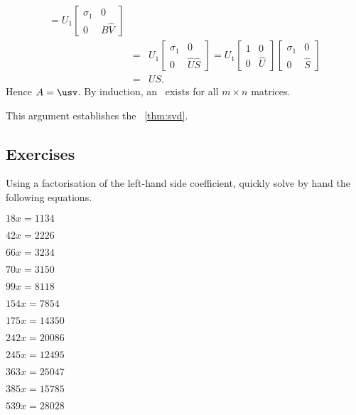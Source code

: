 \begin{enumerate}
\begin{eqnarray*}
=U_1\begin{bmatrix} \sigma_1&0 \\0&B\hat V \end{bmatrix}
\\&=&U_1\begin{bmatrix} \sigma_1&0 \\0&\hat U\hat S \end{bmatrix}
=U_1\begin{bmatrix} 1&0 \\0&\hat U \end{bmatrix}
\begin{bmatrix} \sigma_1&0 \\0&\hat S \end{bmatrix}
\\&=&US.
\end{eqnarray*}
Hence \(A=\usv\). 
By induction, an \svd\ exists for all \(m\times n\) matrices.
\end{enumerate}
This argument establishes the \svd\ \autoref{thm:svd}.







\subsection{Exercises}



\begin{exercise} \label{ex:} 
Using a factorisation of the left-hand side coefficient, quickly solve by hand the following equations.
\begin{parts}
\item \(18 x=1134\)
\item \(42 x=2226\)
\item \(66 x=3234\)
\item \(70 x=3150\)
\item \(99 x=8118\)
\item \(154 x=7854\)
\item \(175 x=14350\)
\item \(242 x=20086\)
\item \(245 x=12495\)
\item \(363 x=25047\)
\item \(385 x=15785\)
\item \(539 x=28028\)
\end{parts}
\end{exercise}




